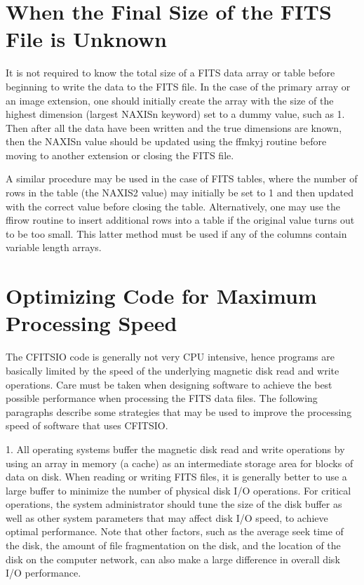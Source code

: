 \section{When the Final Size of the FITS File is Unknown}

It is not required to know the total size of a FITS data array or table
before beginning to write the data to the FITS file.  In the case of
the primary array or an image extension, one should initially create
the array with the size of the highest dimension (largest NAXISn
keyword) set to a dummy value, such as 1.  Then after all the data have
been written and the true dimensions are known, then the NAXISn value
should be updated using the ffmkyj routine before moving to another
extension or closing the FITS file.

A similar procedure may be used in the case of FITS tables, where the
number of rows in the table (the NAXIS2 value) may initially be set to
1 and then updated with the correct value before closing the table.
Alternatively, one may use the ffirow routine to insert additional rows
into a table if the original value turns out to be too small.  This
latter method must be used if any of the columns contain variable
length arrays.


\section{Optimizing Code for Maximum Processing Speed}

The CFITSIO code is generally not very CPU intensive, hence programs are
basically limited by the speed of the underlying magnetic disk read and
write operations.  Care must be taken when designing software to achieve
the best possible performance when processing the FITS data files. The
following paragraphs describe some strategies that may be used to
improve the processing speed of software that uses CFITSIO.

1.  All operating systems buffer the magnetic disk read and write
operations by using an array in memory (a cache) as an intermediate
storage area for blocks of data on disk.  When reading or writing FITS
files, it is generally better to use a large buffer to minimize the
number of physical disk I/O operations.  For critical operations, the
system administrator should tune the size of the disk buffer as well as
other system parameters that may affect disk I/O speed, to achieve
optimal performance.  Note that other factors, such as the average seek
time of the disk, the amount of file fragmentation on the disk, and the
location of the disk on the computer network, can also make a large
difference in overall disk I/O performance.


